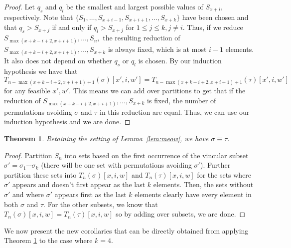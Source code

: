 \documentclass[11pt]{amsart}
\newtheorem{theorem}{Theorem}[section]
\theoremstyle{definition}
\begin{document}
\begin{proof}
	
	Let $q_s$ and $q_l$ be the smallest and largest possible values of $S_{x+i},$ respectively. Note that $\{S_1, \dots, S_{x+i-1}, S_{x+i+1}, \dots, S_{x+k}\}$ have been chosen and that $q_s > S_{x+j}$ if and only if $q_l > S_{x+j}$ for $1 \le j \le k, j \neq i.$  Thus, if we reduce $S_{\max(x+k-i+2, x+i+1)}, \dots, S_{n},$ the resulting reduction of $S_{\max(x+k-i+2, x+i+1)}, \dots, S_{x+k}$ is always fixed, which is at most $i-1$ elements.  It also does not depend on whether $q_s$ or $q_l$ is chosen.  By our induction hypothesis we have that $$T_{n-\max(x+k-i+2, x+i+1)+1}(\sigma)[x', i, w'] = T_{n-\max(x+k-i+2, x+i+1)+1}(\tau)[x', i, w']$$ for any feasible $x', w'.$  This means we can add over partitions to get that if the reduction of $S_{\max(x+k-i+2, x+i+1)}, \dots, S_{x+k}$ is fixed, the number of permutations avoiding $\sigma$ and $\tau$ in this reduction are equal.  Thus, we can use our induction hypothesis and we are done.
\end{proof}

\begin{theorem}
	\label{thm:sandcastle}
	Retaining the setting of Lemma~\ref{lem:meow}, we have $\sigma \equiv \tau$.
\end{theorem}

\begin{proof}
    Partition $S_n$ into sets based on the first occurrence of the vincular subset $\sigma' = \sigma_1\cdots\sigma_k$ (there will be one set with permutations avoiding $\sigma'$).  Further partition these sets into $T_n(\sigma)[x, i, w]$ and $T_n(\tau)[x, i, w]$ for the sets where $\sigma'$ appears and doesn't first appear as the last $k$ elements.  Then, the sets without $\sigma'$ and where $\sigma'$ appears first as the last $k$ elements clearly have every element in both $\sigma$ and $\tau.$  For the other subsets, we know that $T_n(\sigma)[x, i, w] = T_n(\tau)[x, i, w]$ so by adding over subsets, we are done.
\end{proof}

    

We now present the new corollaries that can be directly obtained from applying Theorem \ref{thm:sandcastle} to the case where $k = 4$.
\end{document}
